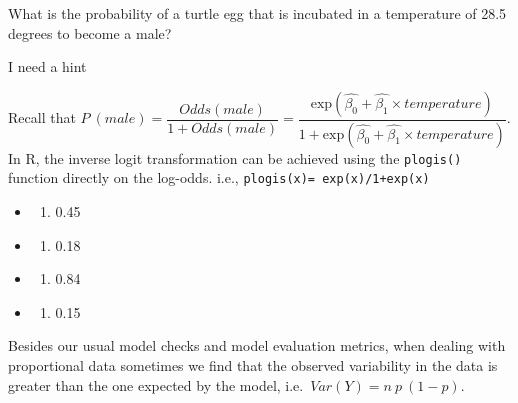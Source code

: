 \documentclass[
  letterpaper,
  DIV=11,
  numbers=noendperiod]{scrartcl}
\providecommand{\tightlist}{%
  \setlength{\itemsep}{0pt}\setlength{\parskip}{0pt}}\usepackage{longtable,booktabs,array}
\begin{document}
\begin{tcolorbox}[enhanced jigsaw, leftrule=.75mm, arc=.35mm, colback=white, opacityback=0, breakable, title={Question}, toprule=.15mm, opacitybacktitle=0.6, titlerule=0mm, rightrule=.15mm, bottomtitle=1mm, coltitle=black, toptitle=1mm, colframe=quarto-callout-tip-color-frame, bottomrule=.15mm, colbacktitle=quarto-callout-tip-color!10!white, left=2mm]

What is the probability of a turtle egg that is incubated in a
temperature of 28.5 degrees to become a male?

I need a hint

Recall that
\(P~ (male) = \dfrac{Odds(male)}{1 + Odds(male)} = \dfrac{\mathrm{exp}(\hat{\beta_0} +\hat{\beta_1} \times temperature)}{1 + \mathrm{exp}(\hat{\beta_0} +\hat{\beta_1} \times temperature)}\).
In R, the inverse logit transformation can be achieved using the
\texttt{plogis()} function directly on the log-odds. i.e.,
\texttt{plogis(x)=\ exp(x)/1+exp(x)}

\begin{itemize}
\tightlist
\item
  \begin{enumerate}
  \def\labelenumi{(\Alph{enumi})}
  \tightlist
  \item
    0.45\\
  \end{enumerate}
\item
  \begin{enumerate}
  \def\labelenumi{(\Alph{enumi})}
  \setcounter{enumi}{1}
  \tightlist
  \item
    0.18\\
  \end{enumerate}
\item
  \begin{enumerate}
  \def\labelenumi{(\Alph{enumi})}
  \setcounter{enumi}{2}
  \tightlist
  \item
    0.84\\
  \end{enumerate}
\item
  \begin{enumerate}
  \def\labelenumi{(\Alph{enumi})}
  \setcounter{enumi}{3}
  \tightlist
  \item
    0.15
  \end{enumerate}
\end{itemize}

\end{tcolorbox}

Besides our usual model checks and model evaluation metrics, when
dealing with proportional data sometimes we find that the observed
variability in the data is greater than the one expected by the model,
i.e.~\(Var(Y) = n ~p~ (1-p)\).
\end{document}
